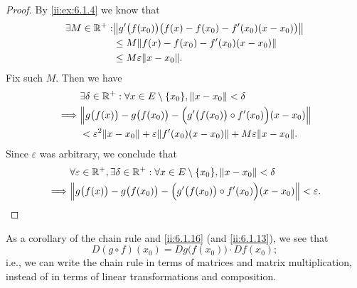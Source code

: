 \begin{proof}
  By \cref{ii:ex:6.1.4} we know that
  \begin{align*}
    \exists M \in \R^+ : & \norm*{g'\big(f(x_0)\big) \big(f(x) - f(x_0) - f'(x_0) (x - x_0)\big)} \\
                         & \leq M \norm*{f(x) - f(x_0) - f'(x_0) (x - x_0)}                       \\
                         & \leq M \varepsilon \norm*{x - x_0}.
  \end{align*}
  Fix such \(M\).
  Then we have
  \begin{align*}
             & \exists \delta \in \R^+ : \forall x \in E \setminus \set{x_0}, \norm*{x - x_0} < \delta                 \\
    \implies & \norm*{g\big(f(x)\big) - g\big(f(x_0)\big) - \Big(g'\big(f(x_0)\big) \circ f'(x_0)\Big) (x - x_0)}      \\
             & < \varepsilon^2 \norm*{x - x_0} + \varepsilon \norm*{f'(x_0)(x - x_0)} + M \varepsilon \norm*{x - x_0}.
  \end{align*}
  Since \(\varepsilon\) was arbitrary, we conclude that
  \begin{align*}
             & \forall \varepsilon \in \R^+, \exists \delta \in \R^+ : \forall x \in E \setminus \set{x_0}, \norm*{x - x_0} < \delta \\
    \implies & \norm*{g\big(f(x)\big) - g\big(f(x_0)\big) - \Big(g'\big(f(x_0)\big) \circ f'(x_0)\Big) (x - x_0)} < \varepsilon.
  \end{align*}
\end{proof}

\begin{note}
  As a corollary of the chain rule and \cref{ii:6.1.16} (and \cref{ii:6.1.13}), we see that
  \[
    D (g \circ f)(x_0) = D g\big(f(x_0)\big) \cdot D f(x_0);
  \]
  i.e., we can write the chain rule in terms of matrices and matrix multiplication, instead of in terms of linear transformations and composition.
\end{note}

